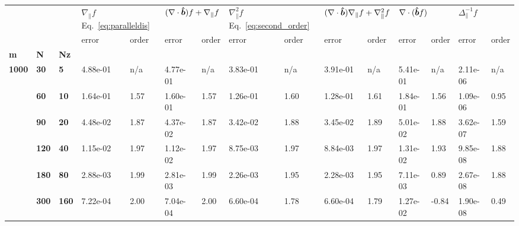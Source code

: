 \begin{tabular}{lllllllllllllll}
\toprule
  &     &     & \multicolumn{2}{l}{$\nabla_\parallel f$
  Eq.~\eqref{eq:paralleldis}} & \multicolumn{2}{l}{$(\nabla\cdot\bm{\hat{b}}) f +
  \nabla_\parallel f$} &
  \multicolumn{2}{l}{$\nabla_\parallel^2 f$ Eq.~\eqref{eq:second_order}} &
  \multicolumn{2}{l}{$(\nabla\cdot\bm{\hat{b}})\nabla_\parallel f + \nabla_\parallel^2
  f$} & \multicolumn{2}{l}{$\nabla\cdot(\bm{\hat{b}} f)$} &
  \multicolumn{2}{l}{$\Delta_\parallel^{-1}f $} \\
     &     &     &     error & order &             error & order &     error & order &     error & order &       error &  order &          error & order \\
\textbf{m} & \textbf{N} & \textbf{Nz} &           &       &                   &       &           &       &           &       &             &        &                &       \\
\midrule
\textbf{1000} & \textbf{30 } & \textbf{5  } &  4.88e-01 &   n/a &          4.77e-01 &   n/a &  3.83e-01 &   n/a &  3.91e-01 &   n/a &    5.41e-01 &    n/a &       2.11e-06 &   n/a \\
     & \textbf{60 } & \textbf{10 } &  1.64e-01 &  1.57 &          1.60e-01 &  1.57 &  1.26e-01 &  1.60 &  1.28e-01 &  1.61 &    1.84e-01 &   1.56 &       1.09e-06 &  0.95 \\
     & \textbf{90 } & \textbf{20 } &  4.48e-02 &  1.87 &          4.37e-02 &  1.87 &  3.42e-02 &  1.88 &  3.45e-02 &  1.89 &    5.01e-02 &   1.88 &       3.62e-07 &  1.59 \\
     & \textbf{120} & \textbf{40 } &  1.15e-02 &  1.97 &          1.12e-02 &  1.97 &  8.75e-03 &  1.97 &  8.84e-03 &  1.97 &    1.31e-02 &   1.93 &       9.85e-08 &  1.88 \\
     & \textbf{180} & \textbf{80 } &  2.88e-03 &  1.99 &          2.81e-03 &  1.99 &  2.26e-03 &  1.95 &  2.28e-03 &  1.95 &    7.11e-03 &   0.89 &       2.67e-08 &  1.88 \\
     & \textbf{300} & \textbf{160} &  7.22e-04 &  2.00 &          7.04e-04 &  2.00 &  6.60e-04 &  1.78 &  6.60e-04 &  1.79 &    1.27e-02 &  -0.84 &       1.90e-08 &  0.49 \\
\bottomrule
\end{tabular}
